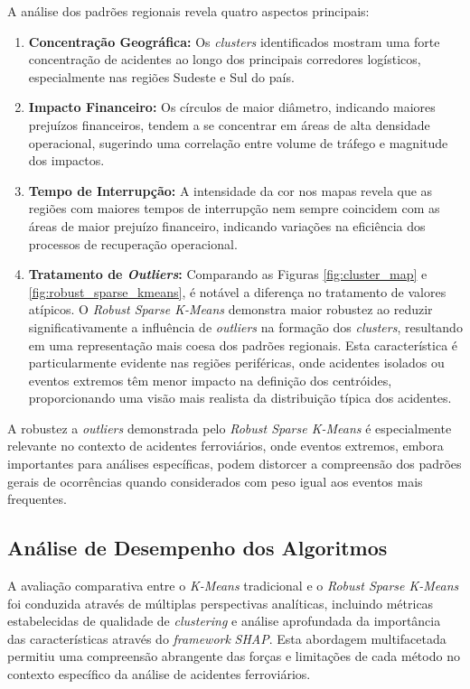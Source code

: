 \documentclass[conference]{IEEEtran}
\begin{document}
A análise dos padrões regionais revela quatro aspectos principais:

\begin{enumerate}
    \item \textbf{Concentração Geográfica:} Os \textit{clusters} identificados mostram uma forte concentração de acidentes ao longo dos principais corredores logísticos, especialmente nas regiões Sudeste e Sul do país.
    
    \item \textbf{Impacto Financeiro:} Os círculos de maior diâmetro, indicando maiores prejuízos financeiros, tendem a se concentrar em áreas de alta densidade operacional, sugerindo uma correlação entre volume de tráfego e magnitude dos impactos.
    
    \item \textbf{Tempo de Interrupção:} A intensidade da cor nos mapas revela que as regiões com maiores tempos de interrupção nem sempre coincidem com as áreas de maior prejuízo financeiro, indicando variações na eficiência dos processos de recuperação operacional.
    
    \item \textbf{Tratamento de \textit{Outliers}:} Comparando as Figuras \ref{fig:cluster_map} e \ref{fig:robust_sparse_kmeans}, é notável a diferença no tratamento de valores atípicos. O \textit{Robust Sparse K-Means} demonstra maior robustez ao reduzir significativamente a influência de \textit{outliers} na formação dos \textit{clusters}, resultando em uma representação mais coesa dos padrões regionais. Esta característica é particularmente evidente nas regiões periféricas, onde acidentes isolados ou eventos extremos têm menor impacto na definição dos centróides, proporcionando uma visão mais realista da distribuição típica dos acidentes.
\end{enumerate}

A robustez a \textit{outliers} demonstrada pelo \textit{Robust Sparse K-Means} é especialmente relevante no contexto de acidentes ferroviários, onde eventos extremos, embora importantes para análises específicas, podem distorcer a compreensão dos padrões gerais de ocorrências quando considerados com peso igual aos eventos mais frequentes.

\subsection{Análise de Desempenho dos Algoritmos}

A avaliação comparativa entre o \textit{K-Means} tradicional e o \textit{Robust Sparse K-Means} foi conduzida através de múltiplas perspectivas analíticas, incluindo métricas estabelecidas de qualidade de \textit{clustering} e análise aprofundada da importância das características através do \textit{framework} \textit{SHAP}. Esta abordagem multifacetada permitiu uma compreensão abrangente das forças e limitações de cada método no contexto específico da análise de acidentes ferroviários.
\end{document}
